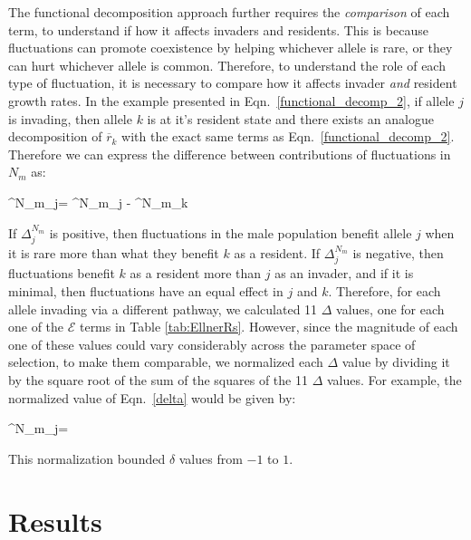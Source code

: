 \documentclass[12pt]{article}
\let\oldequation\equation
\let\oldendequation\endequation
\renewenvironment{equation}
  {\linenomathNonumbers\oldequation}
  {\oldendequation\endlinenomath}
\begin{document}
The functional decomposition approach further requires the \textit{comparison} of each term, to understand if how it affects invaders and residents. This is because fluctuations can promote coexistence by helping whichever allele is rare, or they can hurt whichever allele is common. Therefore, to understand the role of each type of fluctuation, it is necessary to compare how it affects invader \textit{and} resident growth rates. In the example presented in Eqn.~\ref{functional_decomp_2}, if allele $j$ is invading, then allele $k$ is at it's resident state and there exists an analogue decomposition of $\overline{r}_{k}$ with the exact same terms as Eqn.~\ref{functional_decomp_2}. Therefore we can express the difference between contributions of fluctuations in $N_{m}$ as:


\begin{equation}
\Delta^{N_{m}}_{j}= ^{N_{m}}_{j} - ^{N_{m}}_{k}
\label{delta}
\end{equation}

If $\Delta^{N_{m}}_{j}$ is positive, then fluctuations in the male population benefit allele $j$ when it is rare more than what they benefit $k$ as a resident. If $\Delta^{N_{m}}_{j}$ is negative, then fluctuations benefit $k$ as a resident more than $j$ as an invader, and if it is minimal, then fluctuations have an equal effect in $j$ and $k$. Therefore, for each allele invading via a different pathway, we calculated 11 $\Delta$ values, one for each one of the $\mathcal{E}$ terms in Table \ref{tab:EllnerRs}. However, since the magnitude of each one of these values could vary considerably across the parameter space of selection, to make them comparable, we normalized each $\Delta$ value by dividing it by the square root of the sum of the squares of the 11 $\Delta$ values. For example, the normalized value of Eqn.~\ref{delta} would be given by:



\begin{equation}
  \delta^{N_{m}}_{j}= 
\end{equation}

This normalization bounded $\delta$ values from $-1$ to $1$.

\section{Results}
\end{document}
